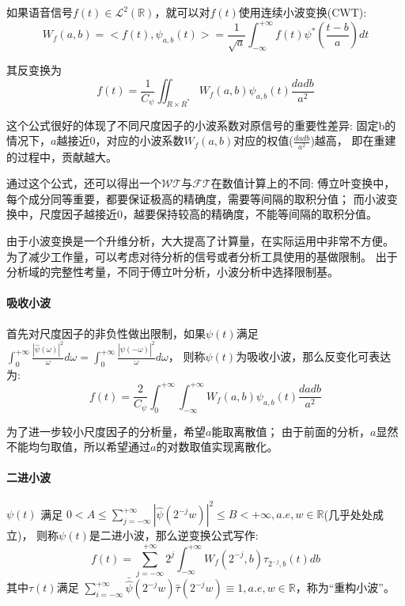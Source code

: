 \documentclass{morningstar}
\begin{document}
如果语音信号$f(t) \in \mathcal{L}^{2}(\mathbb{R})$，就可以对$f(t)$使用连续小波变换(CWT):\cite{wavelet7}
\begin{equation}
    W_{f}(a, b)=<f(t), \psi_{a, b}(t)>=\frac{1}{\sqrt{a}} \int_{-\infty}^{+\infty} f(t) \psi^{*}\left(\frac{t-b}{a}\right) d t
\end{equation}

其反变换为
\begin{equation}
    f(t) = \frac{1}{C_\psi} \iint_{R\times R^{*}}W_{f}(a,b)\psi_{a,b}(t)\frac{d a d b }{a^{2}}
\end{equation}

这个公式很好的体现了不同尺度因子的小波系数对原信号的重要性差异: 
固定b的情况下，$a$越接近0，对应的小波系数$W_{f}(a,b)$对应的权值($\frac{d a d b }{a^{2}}$)越高，
即在重建的过程中，贡献越大。

通过这个公式，还可以得出一个$\mathcal{WT}$与$\mathcal{FT}$在数值计算上的不同: 
傅立叶变换中，每个成分同等重要，都要保证极高的精确度，需要等间隔的取积分值；
而小波变换中，尺度因子越接近0，越要保持较高的精确度，不能等间隔的取积分值。

由于小波变换是一个升维分析，大大提高了计算量，在实际运用中非常不方便。
为了减少工作量，可以考虑对待分析的信号或者分析工具使用的基做限制。
出于分析域的完整性考量，不同于傅立叶分析，小波分析中选择限制基。

\paragraph{吸收小波} 
首先对尺度因子的非负性做出限制，如果$\psi(t)$满足
$
\int_0^{+\infty}\frac{|\hat{\psi}(\omega)|^{2}}{\omega}d \omega = \int_0^{+\infty}\frac{|\hat{\psi}(-\omega)|^{2}}{\omega}d \omega
$，
则称$\psi(t)$为吸收小波，那么反变化可表达为: 
\begin{equation}
    f(t) = \frac{2}{C_\psi} \int_0^{+\infty} \int_{-\infty}^{+\infty}W_{f}(a,b)\psi_{a,b}(t)\frac{d a d b }{a^{2}}
\end{equation}

为了进一步较小尺度因子的分析量，希望$a$能取离散值；
由于前面的分析，$a$显然不能均匀取值，所以希望通过$a$的对数取值实现离散化。

\paragraph{二进小波}
$\psi(t)$ 满足
$
0<A \leqslant \sum_{j=-\infty}^{+\infty}\left|\hat{\psi}\left(2^{-j} w\right)\right|^{2} \leqslant B<+\infty, a.e, w\in \mathbb{R}
$(几乎处处成立)，
则称$\psi(t)$是二进小波，那么逆变换公式写作:  
\begin{equation}
    f(t)=\sum_{j =-\infty}^{+\infty} 2^{j} \int_{-\infty}^{+\infty}  W_{f}\left(2^{-j}, b\right)\tau_{2^{-j},b}(t)d b
\end{equation}
其中$\tau(t)$满足
$
\sum_{i=-\infty}^{+\infty} \bar{\hat{\psi}}\left(2^{-j} w\right) \hat{\tau}\left(2^{-j} w\right) \equiv 1 , a.e, w \in \mathbb{R}
$，称为“重构小波”。
\end{document}
